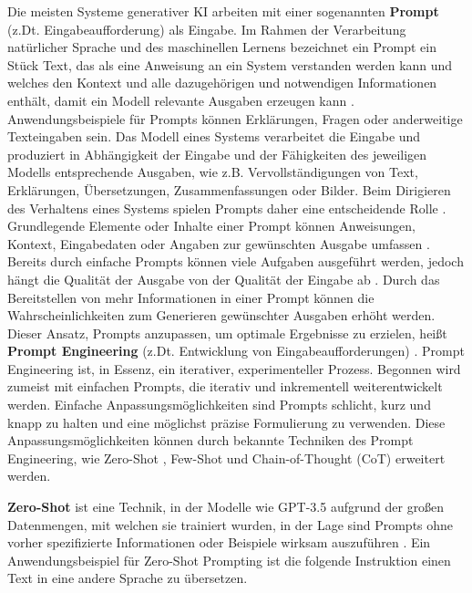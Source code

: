 Die meisten Systeme generativer KI arbeiten mit einer sogenannten \textbf{Prompt} (z.Dt. Eingabeaufforderung) als Eingabe.
Im Rahmen der Verarbeitung natürlicher Sprache und des maschinellen Lernens bezeichnet ein Prompt ein Stück Text, das als eine Anweisung an ein System verstanden werden kann und welches den Kontext und alle dazugehörigen und notwendigen Informationen enthält, damit ein Modell relevante Ausgaben erzeugen kann \cite{gradientpub-prompt,hopsworks-prompt-engineering}.
Anwendungsbeispiele für Prompts können Erklärungen, Fragen oder anderweitige Texteingaben sein.
Das Modell eines Systems verarbeitet die Eingabe und produziert in Abhängigkeit der Eingabe und der Fähigkeiten des jeweiligen Modells entsprechende Ausgaben, wie z.B. Vervollständigungen von Text, Erklärungen, Übersetzungen, Zusammenfassungen oder Bilder.
Beim Dirigieren des Verhaltens eines Systems spielen Prompts daher eine entscheidende Rolle \cite{skimai-prompts}.
Grundlegende Elemente oder Inhalte einer Prompt können Anweisungen, Kontext, Eingabedaten oder Angaben zur gewünschten Ausgabe umfassen \cite{promptingguide-basiscs-prompting}.
Bereits durch einfache Prompts können viele Aufgaben ausgeführt werden, jedoch hängt die Qualität der Ausgabe von der Qualität der Eingabe ab \cite{promptingguide-basiscs-prompting}.
Durch das Bereitstellen von mehr Informationen in einer Prompt können die Wahrscheinlichkeiten zum Generieren gewünschter Ausgaben erhöht werden.
Dieser Ansatz, Prompts anzupassen, um optimale Ergebnisse zu erzielen, heißt \textbf{Prompt Engineering} (z.Dt. Entwicklung von Eingabeaufforderungen) \cite{promptingguide}.
Prompt Engineering ist, in Essenz, ein iterativer, experimenteller Prozess.
Begonnen wird zumeist mit einfachen Prompts, die iterativ und inkrementell weiterentwickelt werden.
Einfache Anpassungsmöglichkeiten sind Prompts schlicht, kurz und knapp zu halten und eine möglichst präzise Formulierung zu verwenden.
Diese Anpassungsmöglichkeiten können durch bekannte Techniken des Prompt Engineering, wie Zero-Shot \cite{promptingguide-zero-shot}, Few-Shot \cite{promptingguide-few-shot} und Chain-of-Thought (CoT) \cite{promptingguide-cot} erweitert werden.

\textbf{Zero-Shot} ist eine Technik, in der Modelle wie GPT-3.5 aufgrund der großen Datenmengen, mit welchen sie trainiert wurden, in der Lage sind Prompts ohne vorher spezifizierte Informationen oder Beispiele wirksam auszuführen \cite{promptingguide-zero-shot}.
Ein Anwendungsbeispiel für Zero-Shot Prompting ist die folgende Instruktion einen Text in eine andere Sprache zu übersetzen.

